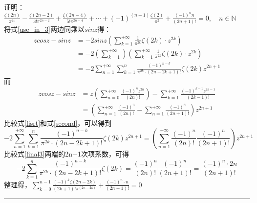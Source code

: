 \documentclass[18pt]{article}
\begin{document}
\section{}
证明：$\frac{\zeta(2n)}{\pi^{2n}}-\frac{\zeta(2n-2)}{3!\pi^{2n-2}}+\frac{\zeta(2n-4)}{5!\pi^{2n-4}}+ \cdots+(-1)^(n-1)\frac{\zeta(2)}{\pi^{2}}+\frac{(-1)^n n}{(2n+1)!}=0, \quad n\in  \mathbb{N}$\\
将式\eqref{use_in_3}两边同乘以$sinz$得：
\begin{equation}
\begin{split}
	zcosz-sinz &=-2sinz(\sum\limits_{k=1}^{+\infty}\frac{1}{\pi^{2k}}\zeta(2k) \cdot z^{2k})\\
			   &=-2(\sum\limits_{k=1}^{+\infty})(\sum\limits_{k=1}^{+\infty}\frac{1}{\pi^{2k}}\zeta(2k) \cdot z^{2k})\\
			   &=-2\sum\limits_{n=1}^{+\infty} \sum\limits_{k=1}^{n} \frac{(-1)^{n-k}}{\pi^{2k} \cdot (2n-2k+1)!} \zeta(2k) z^{2n+1}
			   \label{fisrt}
\end{split}
\end{equation}
而
\begin{equation}
\begin{split}
	zcosz-sinz &=z(\sum\limits_{n=0}^{+\infty} \frac{(-1)^n z^{2n}}{(2n)!}) -\sum\limits_{k=1}^{+\infty}\frac{(-1)^{k-1}z^{2k-1}}{(2k-1)!}\label{second}\\
			   &=(\sum\limits_{n=1}^{+\infty}\frac{(-1)^n}{(2n)!} - \sum\limits_{n=1}^{+\infty} \frac{(-1)^n}{(2n+1)!})z^{2n+1}
\end{split}
\end{equation}
比较式\eqref{fisrt}和式\eqref{second}，可以得到
\begin{equation}
	-2\sum\limits_{n=1}^{+\infty} \sum\limits_{k=1}^{n} \frac{(-1)^{n-k}}{\pi^{2k} \cdot (2n-2k+1)!} \zeta(2k) z^{2n+1}=(\sum\limits_{n=1}^{+\infty}\frac{(-1)^n}{(2n)!}  \frac{(-1)^n}{(2n+1)!})z^{2n+1} \label{final3}
\end{equation}
比较式\eqref{final3}两端的2n+1次项系数，可得
\begin{equation}
-2\sum\limits_{k=1}^{n} \frac{(-1)^{n-k}}{\pi^{2k} \cdot (2n-2k+1)!} \zeta(2k) = \frac{(-1)^n}{(2n)!}  \frac{(-1)^n}{(2n+1)!} = \frac{(-1)^n \cdot 2n}{(2n+1)!}
\end{equation}
整理得，$\sum\limits_{k=0}^{n-1} \frac{(-1)^k \zeta(2n-2k)}{(2k+1)! \pi^(2n-2k)} + \frac{(-1)^n \cdot n}{(2n+1)!} =0$ \quad \rule{3mm}{3mm}\\
\end{document}
